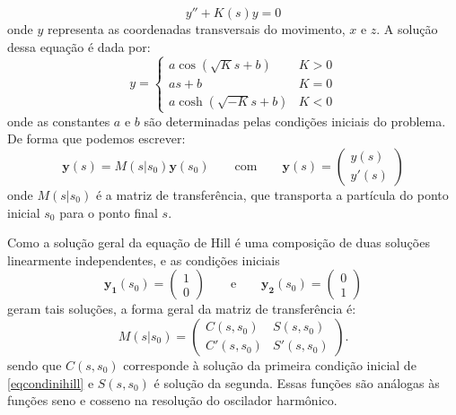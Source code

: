 \begin{equation}\label{eqoscbet}
 y''+K(s)y=0
\end{equation}
onde $y$ representa as coordenadas transversais do movimento, $x$ e $z$. A solução dessa equação é dada por:
\begin{equation}
 y=\left\{\begin{array}{ll}
           a \cos\left(\sqrt{K}s+b\right) & 	K>0 \\
	   a s +b                      &	K=0 \\
	   a \cosh\left(\sqrt{-K}s+b\right) &	K<0
          \end{array}\right.
\end{equation}
onde as constantes $a$ e $b$ são determinadas pelas condições iniciais do problema. De forma que podemos escrever:
\begin{equation}
 \mathbf{y}(s)=M(s|s_0)\mathbf{y}(s_0)
\qquad \mathrm{com}\qquad
\mathbf{y}(s) = \left(\begin{array}{c}
			y(s) \\
			y'(s)
		       \end{array}\right)
\end{equation}
onde $M(s|s_0)$ é a matriz de transferência, que transporta a partícula do ponto inicial $s_0$ para o ponto final $s$.

Como a solução geral da equação de Hill é uma composição de duas soluções linearmente independentes, e as condições iniciais
\begin{equation} \label{eqcondinihill}
\mathbf{y_1}(s_0)=\left(\begin{array}{c}
			1 \\
			0
		       \end{array}\right)
\qquad \mathrm{e} \qquad
\mathbf{y_2}(s_0)=\left(\begin{array}{c}
			0 \\
			1
		       \end{array}\right)
\end{equation}
geram tais soluções, a forma geral da matriz de transferência é:
\begin{equation}\label{eqmatriztransf}
 M(s|s_0)=\left(\begin{array}{cc}
                  C(s,s_0)  &  S(s,s_0) \\
	          C'(s,s_0) &  S'(s,s_0)
		\end{array}\right).
\end{equation}
sendo que $C(s,s_0)$ corresponde à solução da primeira condição inicial de \mbox{\eqref{eqcondinihill}} e $S(s,s_0)$ é solução da segunda. Essas funções são análogas às funções seno e cosseno na resolução do oscilador harmônico.

